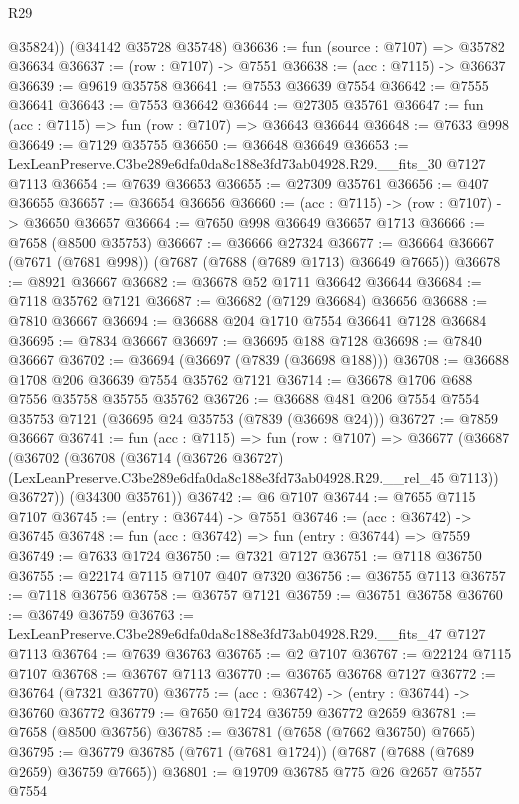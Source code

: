 \begin{lexlean}{R29}
\begin{coremodule}
        @35824))
    (@34142 @35728 @35748)
@36636 := fun (source : @7107) => @35782 @36634
@36637 := (row : @7107) -> @7551
@36638 := (acc : @7115) -> @36637
@36639 := @9619 @35758
@36641 := @7553 @36639 @7554
@36642 := @7555 @36641
@36643 := @7553 @36642
@36644 := @27305 @35761
@36647 := fun (acc : @7115) => fun (row : @7107) => @36643 @36644
@36648 := @7633 @998
@36649 := @7129 @35755
@36650 := @36648 @36649
@36653 := LexLeanPreserve.C3be289e6dfa0da8c188e3fd73ab04928.R29.__fits_30 @7127 @7113
@36654 := @7639 @36653
@36655 := @27309 @35761
@36656 := @407 @36655
@36657 := @36654 @36656
@36660 := (acc : @7115) -> (row : @7107) -> @36650 @36657
@36664 := @7650 @998 @36649 @36657 @1713
@36666 := @7658 (@8500 @35753)
@36667 := @36666 @27324
@36677 := @36664 @36667 (@7671 (@7681 @998)) (@7687 (@7688 (@7689 @1713) @36649 @7665))
@36678 := @8921 @36667
@36682 := @36678 @52 @1711 @36642 @36644
@36684 := @7118 @35762 @7121
@36687 := @36682 (@7129 @36684) @36656
@36688 := @7810 @36667
@36694 := @36688 @204 @1710 @7554 @36641 @7128 @36684
@36695 := @7834 @36667
@36697 := @36695 @188 @7128
@36698 := @7840 @36667
@36702 := @36694 (@36697 (@7839 (@36698 @188)))
@36708 := @36688 @1708 @206 @36639 @7554 @35762 @7121
@36714 := @36678 @1706 @688 @7556 @35758 @35755 @35762
@36726 := @36688 @481 @206 @7554 @7554 @35753 @7121 (@36695 @24 @35753 (@7839 (@36698 @24)))
@36727 := @7859 @36667
@36741 := fun (acc : @7115) =>
  fun (row : @7107) =>
  @36677
    (@36687
      (@36702
        (@36708
          (@36714
            (@36726 @36727)
            (LexLeanPreserve.C3be289e6dfa0da8c188e3fd73ab04928.R29.__rel_45 @7113))
          @36727))
      (@34300 @35761))
@36742 := @6 @7107
@36744 := @7655 @7115 @7107
@36745 := (entry : @36744) -> @7551
@36746 := (acc : @36742) -> @36745
@36748 := fun (acc : @36742) => fun (entry : @36744) => @7559
@36749 := @7633 @1724
@36750 := @7321 @7127
@36751 := @7118 @36750
@36755 := @22174 @7115 @7107 @407 @7320
@36756 := @36755 @7113
@36757 := @7118 @36756
@36758 := @36757 @7121
@36759 := @36751 @36758
@36760 := @36749 @36759
@36763 := LexLeanPreserve.C3be289e6dfa0da8c188e3fd73ab04928.R29.__fits_47 @7127 @7113
@36764 := @7639 @36763
@36765 := @2 @7107
@36767 := @22124 @7115 @7107
@36768 := @36767 @7113
@36770 := @36765 @36768 @7127
@36772 := @36764 (@7321 @36770)
@36775 := (acc : @36742) -> (entry : @36744) -> @36760 @36772
@36779 := @7650 @1724 @36759 @36772 @2659
@36781 := @7658 (@8500 @36756)
@36785 := @36781 (@7658 (@7662 @36750) @7665)
@36795 := @36779 @36785 (@7671 (@7681 @1724)) (@7687 (@7688 (@7689 @2659) @36759 @7665))
@36801 := @19709 @36785 @775 @26 @2657 @7557 @7554

\end{coremodule}
\end{lexlean}
